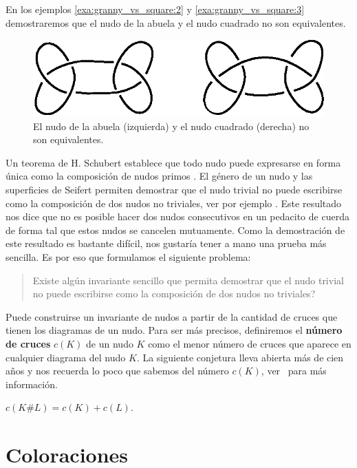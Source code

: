 \documentclass[graybox]{svmult}
\begin{document}
En los ejemplos \ref{exa:granny_vs_square:2} y \ref{exa:granny_vs_square:3}
demostraremos que el nudo de la abuela y el nudo cuadrado no son equivalentes.

\begin{figure}[ht]
	\centering
	\includegraphics[scale=0.6]{images/grannyandsquare}
	\caption{El nudo de la abuela (izquierda) y el nudo cuadrado (derecha)
	no son equivalentes.}
	\label{fig:granny_and_square}
\end{figure}

Un teorema de H. Schubert establece que todo nudo puede expresarse en forma
única como la composición de nudos primos \cite[VII]{MR3156509}.  El género de
un nudo y las superficies de Seifert permiten demostrar que el nudo trivial no
puede escribirse como la composición de dos nudos no triviales, ver por ejemplo
\cite[\S4.3]{MR2079925}. Este resultado nos dice que no es posible hacer dos
nudos consecutivos en un pedacito de cuerda de forma tal que estos nudos se
cancelen mutuamente.  Como la demostración de este resultado es bastante
difícil, nos gustaría tener a mano una prueba más sencilla. Es por eso que
formulamos el siguiente problema:
\begin{quote}
	\textquestiondown Existe algún invariante sencillo que permita
	demostrar que el nudo trivial no puede escribirse como la composición
	de dos nudos no triviales? 
\end{quote}

Puede construirse un invariante de nudos a partir de la cantidad de cruces que
tienen los diagramas de un nudo.  Para ser más precisos, definiremos el
\textbf{número de cruces} $c(K)$ de un nudo $K$ como el menor número de cruces
que aparece en cualquier diagrama del nudo $K$. La siguiente conjetura lleva
abierta más de cien años y nos recuerda lo poco que sabemos del número $c(K)$,
ver~\cite[\S 3.3]{MR2079925} para más información.

\begin{conjecture}
	$c(K\#L)=c(K)+c(L)$. 
\end{conjecture}

\section{Coloraciones}
\label{section:coloreos}
\end{document}
